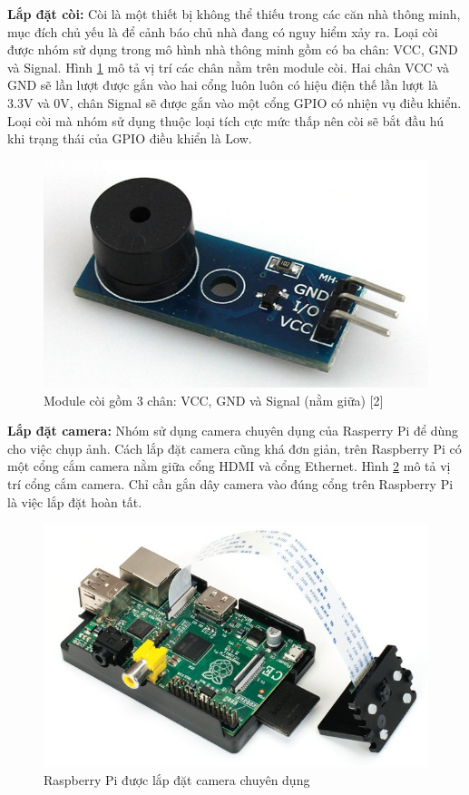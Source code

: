 \documentclass[11pt,a4paper,oneside]{book}
\begin{document}
\textbf{Lắp đặt còi:} Còi là một thiết bị không thể thiếu trong các căn nhà thông minh, mục đích chủ yếu là để cảnh báo chủ nhà đang có nguy hiểm xảy ra. Loại còi được nhóm sử dụng trong mô hình nhà thông minh gồm có ba chân: VCC, GND và Signal. Hình \ref{fig:6-buzzer} mô tả vị trí các chân nằm trên module còi. Hai chân VCC và GND sẽ lần lượt được gắn vào hai cổng luôn luôn có hiệu điện thế lần lượt là 3.3V và 0V, chân Signal sẽ được gắn vào một cổng GPIO có nhiện vụ điều khiển. Loại còi mà nhóm sử dụng thuộc loại tích cực mức thấp nên còi sẽ bắt đầu hú khi trạng thái của GPIO điều khiển là Low.

\begin{figure}[h]
  \centering
     \includegraphics[scale=0.3]{6-buzzer}
  \caption{Module còi gồm 3 chân: VCC, GND và Signal (nằm giữa) [2]}\label{fig:6-buzzer}
\end{figure}

\textbf{Lắp đặt camera:} Nhóm sử dụng camera chuyên dụng của Rasperry Pi để dùng cho việc chụp ảnh. Cách lắp đặt camera cũng khá đơn giản, trên Raspberry Pi có một cổng cắm camera nằm giữa cổng HDMI và cổng Ethernet. Hình \ref{fig:6-camera} mô tả vị trí cổng cắm camera. Chỉ cần gắn dây camera vào đúng cổng trên Raspberry Pi là việc lắp đặt hoàn tất.

\begin{figure}[h]
  \centering
     \includegraphics[scale=0.3]{6-camera}
  \caption{Raspberry Pi được lắp đặt camera chuyên dụng}\label{fig:6-camera}
\end{figure}
\end{document}
